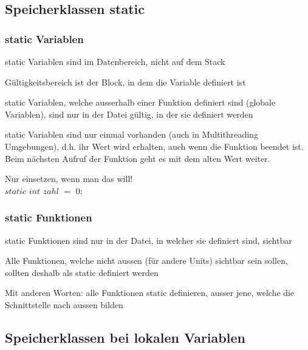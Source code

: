 			\subsection{Speicherklassen static}
				\begin{minipage}[t]{9 cm}
					\subsubsection{static Variablen}
					\begin{compactitem}
						\item static Variablen sind im Datenbereich, nicht auf dem Stack
						\item Gültigkeitsbereich ist der Block, in dem die Variable definiert ist
						\item static Variablen, welche ausserhalb einer Funktion definiert sind (globale Variablen), sind nur in der Datei gültig, in der sie definiert werden
						\item static Variablen sind nur einmal vorhanden (auch in Multithreading Umgebungen), d.h. ihr Wert wird erhalten, auch wenn die Funktion beendet ist. Beim nächsten Aufruf der Funktion geht es mit dem alten Wert weiter.
						\item Nur einsetzen, wenn man das will!\\
						$static$ $int$ $zahl$ $=$ $0$;
					\end{compactitem}
				\end{minipage}
				\hspace*{0.5cm}
				\begin{minipage}[t]{9 cm}
					\subsubsection{static Funktionen}
					\begin{compactitem}
						\item static Funktionen sind nur in der Datei, in welcher sie definiert sind,
						sichtbar
						\item Alle Funktionen, welche nicht aussen (für andere Units) sichtbar sein
						sollen, sollten deshalb als static definiert werden
						\item Mit anderen Worten: alle Funktionen static definieren, ausser jene, welche die Schnittstelle
						nach aussen bilden
					\end{compactitem}
				\end{minipage}
			\subsection{Speicherklassen bei lokalen Variablen}
